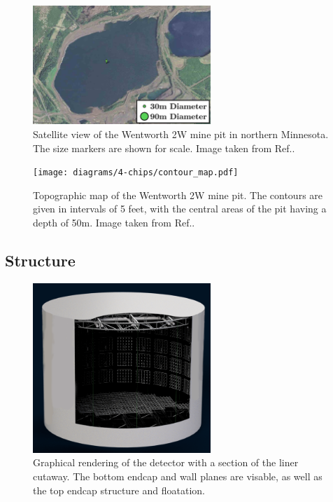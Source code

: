 \begin{figure} %
    \includegraphics[width=0.6\textwidth]{diagrams/4-chips/location.png}
    \caption[Satellite view of the Wentworth 2W mine pit.]
    {Satellite view of the Wentworth 2W mine pit in northern Minnesota.
        The size markers are shown for scale. Image taken from Ref.\cite{adamson2013}.}
    \label{fig:location}
\end{figure}

\begin{figure} %
    \texttt{[image: diagrams/4-chips/contour\_map.pdf]}
    \caption[Topographic map of the Wentworth 2W mine pit.]
    {Topographic map of the Wentworth 2W mine pit. The contours are given in intervals of 5 feet,
        with the central areas of the pit having a depth of 50m. Image taken from
        Ref.\cite{adamson2013}.}
    \label{fig:contour_map}
\end{figure}

\subsection{Structure} %
\label{sec:chips_detector_structure} %

\begin{figure} %
    \includegraphics[width=0.6\textwidth]{diagrams/4-chips/chips_render_1.png}
    \caption[Graphical rendering of the \chipsfive detector with liner cutaway.]
    {Graphical rendering of the \chipsfive detector with a section of the liner cutaway.
        The bottom endcap and wall planes are visable,
        as well as the top endcap structure and floatation.}
    \label{fig:chips_render_1}
\end{figure}

